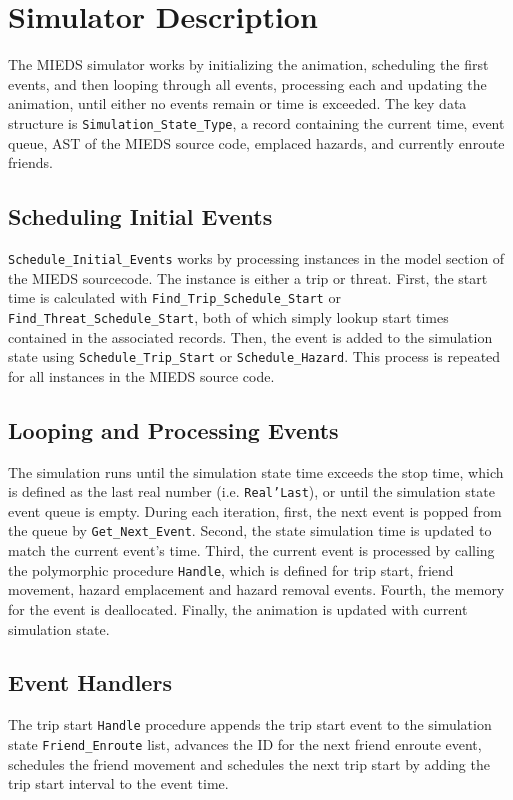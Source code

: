 \documentclass[12pt,letterpaper,titlepage]{article}
\newcommand{\code}[1]{\texttt{#1}}
\newcommand{\mieds}[0]{\textsc{MIEDS}}
\begin{document}

\doublespacing

\section{Simulator Description}

The \mieds{} simulator works by initializing the animation, scheduling
the first events, and then looping through all events, processing each
and updating the animation, until either no events remain or time is
exceeded.  The key data structure is \code{Simulation_State_Type}, a
record containing the current time, event queue, AST of the \mieds
source code, emplaced hazards, and currently enroute friends.

\subsection{Scheduling Initial Events}

\code{Schedule_Initial_Events} works by processing instances in the
model section of the \mieds{} sourcecode.  The instance is either a
trip or threat.  First, the start time is calculated with
\code{Find_Trip_Schedule_Start} or \code{Find_Threat_Schedule_Start},
both of which simply lookup start times contained in the associated
records.  Then, the event is added to the simulation state using
\code{Schedule_Trip_Start} or \code{Schedule_Hazard}.  This process is
repeated for all instances in the \mieds{} source code.

\subsection{Looping and Processing Events}

The simulation runs until the simulation state time exceeds the stop
time, which is defined as the last real number
(i.e. \code{Real'Last}), or until the simulation state event queue is
empty.  During each iteration, first, the next event is popped from
the queue by \code{Get_Next_Event}.  Second, the state simulation time
is updated to match the current event's time.  Third, the current
event is processed by calling the polymorphic procedure \code{Handle},
which is defined for trip start, friend movement, hazard emplacement
and hazard removal events.  Fourth, the memory for the event is
deallocated.  Finally, the animation is updated with current
simulation state.

\subsection{Event Handlers}
The trip start \code{Handle} procedure appends the trip start event to
the simulation state \code{Friend_Enroute} list, advances the ID for
the next friend enroute event, schedules the friend movement and
schedules the next trip start by adding the trip start interval to the
event time.
\end{document}
